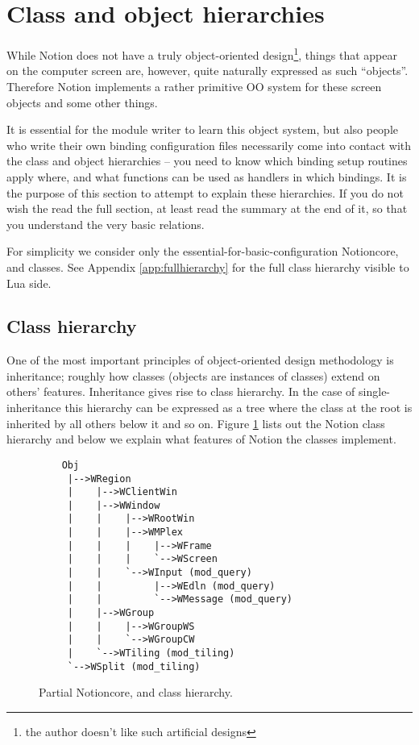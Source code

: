 
\section{Class and object hierarchies}
\label{sec:objects}

While Notion does not have a truly object-oriented design\footnote{the 
author doesn't like such artificial designs},
things that appear on the computer screen are, however, quite
naturally expressed as such ``objects''. Therefore Notion implements
a rather primitive OO system for these screen objects and some
other things. 

It is essential for the module writer to learn this object
system, but also people who write their own binding configuration files
necessarily come into contact with the class and object hierarchies
-- you need to know which binding setup routines apply where, 
and what functions can be used as handlers in which bindings.
It is the purpose of this section to attempt to explain these 
hierarchies. If you do not wish the read the full section, at least
read the summary at the end of it, so that you understand the very
basic relations.

For simplicity we consider only the essential-for-basic-configuration
Notioncore,  and  classes. 
See Appendix \ref{app:fullhierarchy} for the full class hierarchy visible
to Lua side.

\subsection{Class hierarchy}

One of the most important principles of object-oriented design methodology
is inheritance; roughly how classes (objects are instances of classes)
extend on others' features. Inheritance gives rise to class hierarchy.
In the case of single-inheritance this hierarchy can be expressed as a
tree where the class at the root is inherited by all others below it
and so on. Figure \ref{fig:classhierarchy} lists out the Notion class 
hierarchy and below we explain what features of Notion the classes 
implement.

\begin{figure}
\begin{htmlonly}
\docode %
\end{htmlonly}
\begin{verbatim}
    Obj
     |-->WRegion
     |    |-->WClientWin
     |    |-->WWindow
     |    |    |-->WRootWin
     |    |    |-->WMPlex
     |    |    |    |-->WFrame
     |    |    |    `-->WScreen
     |    |    `-->WInput (mod_query)
     |    |         |-->WEdln (mod_query)
     |    |         `-->WMessage (mod_query)
     |    |-->WGroup
     |    |    |-->WGroupWS
     |    |    `-->WGroupCW
     |    `-->WTiling (mod_tiling)
     `-->WSplit (mod_tiling)
\end{verbatim}
\caption{Partial Notioncore,  and  
    class hierarchy.}
\label{fig:classhierarchy}
\end{figure}

